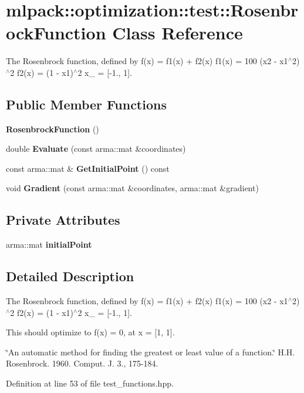 \section{mlpack\+:\+:optimization\+:\+:test\+:\+:Rosenbrock\+Function Class Reference}
\label{classmlpack_1_1optimization_1_1test_1_1RosenbrockFunction}


The Rosenbrock function, defined by f(x) = f1(x) + f2(x) f1(x) = 100 (x2 -\/ x1$^\wedge$2)$^\wedge$2 f2(x) = (1 -\/ x1)$^\wedge$2 x\+\_ = [-\/1., 1].  


\subsection*{Public Member Functions}
\begin{DoxyCompactItemize}
\item 
{\bf Rosenbrock\+Function} ()
\item 
double {\bf Evaluate} (const arma\+::mat \&coordinates)
\item 
const arma\+::mat \& {\bf Get\+Initial\+Point} () const 
\item 
void {\bf Gradient} (const arma\+::mat \&coordinates, arma\+::mat \&gradient)
\end{DoxyCompactItemize}
\subsection*{Private Attributes}
\begin{DoxyCompactItemize}
\item 
arma\+::mat {\bf initial\+Point}
\end{DoxyCompactItemize}


\subsection{Detailed Description}
The Rosenbrock function, defined by f(x) = f1(x) + f2(x) f1(x) = 100 (x2 -\/ x1$^\wedge$2)$^\wedge$2 f2(x) = (1 -\/ x1)$^\wedge$2 x\+\_ = [-\/1., 1]. 

This should optimize to f(x) = 0, at x = [1, 1].

\char`\"{}\+An automatic method for finding the greatest or least value of a function.\char`\"{} H.\+H. Rosenbrock. 1960. Comput. J. 3., 175-\/184. 

Definition at line 53 of file test\+\_\+functions.\+hpp.



